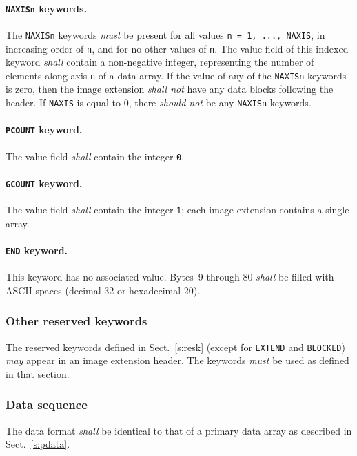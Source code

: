 \documentclass[onecolumn]{aa}
\begin{document}
   \paragraph{{\tt NAXISn} keywords.}
   \label{s:naxisni}
 The {\tt NAXISn} keywords {\em must} be present 
 for all values {\tt n = 1, ..., NAXIS}, in increasing order of {\tt n}, and for no other values of
 {\tt n}.
 The value field of this indexed keyword {\em shall} contain a non-negative 
 integer, representing the number of elements along axis {\tt n} of 
 a data array. If the value of any of the {\tt NAXISn} keywords is zero, 
 then the image extension {\em shall not} have any data blocks following the
 header.  If {\tt NAXIS} is equal to 0, 
 there {\em should not} be any {\tt NAXISn}  keywords.
  
   \paragraph{{\tt PCOUNT} keyword.}
 The value field {\em shall} contain the integer {\tt 0}. 
  
   \paragraph{{\tt GCOUNT} keyword.}
 The value field {\em shall} contain the integer {\tt 1}; each
 image extension contains a single array.
  
   \paragraph{{\tt END} keyword.}
 This keyword has no associated value.  Bytes~9 through 80
 {\em shall} be filled with ASCII spaces (decimal 32 or hexadecimal 20).
  
                        
   \subsubsection{Other reserved keywords}  

The reserved keywords defined in  Sect.\ \ref{s:resk} (except for {\tt EXTEND}
and {\tt BLOCKED}) {\em may} appear in an
image extension header.  The keywords {\em must} be used as defined in 
that section.

   \subsubsection{Data sequence}
   The data format {\em shall} be identical to that of a primary data array 
   as described in Sect.\ \ref{s:pdata}.
\end{document}
